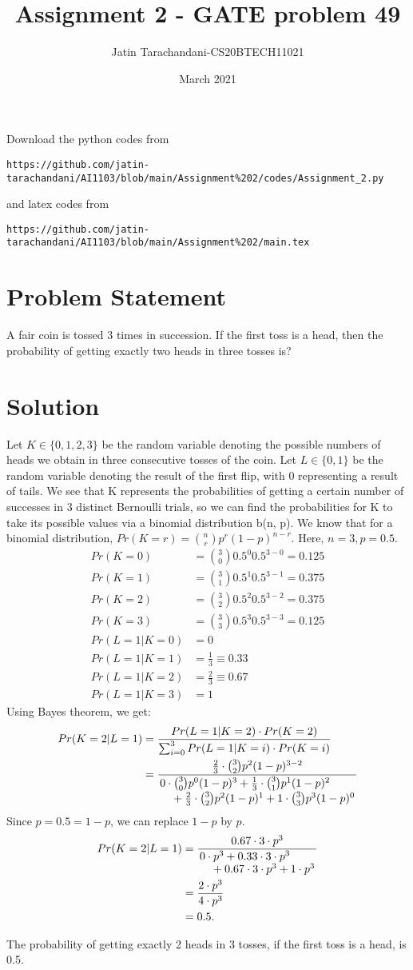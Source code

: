 \documentclass[twocolumn]{article}
\title{Assignment 2 - GATE problem 49}
\author{Jatin Tarachandani-CS20BTECH11021}
\date{March 2021}
\begin{document}
\maketitle
Download the python codes from 
\begin{lstlisting}
https://github.com/jatin-tarachandani/AI1103/blob/main/Assignment%202/codes/Assignment_2.py
\end{lstlisting}
%
and latex codes from 
%
\begin{lstlisting}
https://github.com/jatin-tarachandani/AI1103/blob/main/Assignment%202/main.tex
\end{lstlisting}
\section{Problem Statement}
A fair coin is tossed 3 times in succession. If the first toss is a head, then the probability of getting exactly two heads in three tosses is?
\section{Solution}
Let $K \in \{0, 1, 2, 3\}$ be the random variable denoting the possible numbers of heads we obtain in three consecutive tosses of the coin. Let $L \in \{0, 1\}$ be the random variable denoting the result of the first flip, with 0 representing a result of tails.
We see that K represents the probabilities of getting a certain number of successes in 3 distinct Bernoulli trials, so we can find the probabilities for K to take its possible values via a binomial distribution b(n, p).
We know that for a binomial distribution, $Pr(K=r)=\binom{n}{r}p^r (1-p)^{n-r}$. Here, $n=3, p=0.5$.
\begin{align}
    Pr(K=0)&=\binom{3}{0}0.5^0 0.5^{3-0}=0.125\\
    Pr(K=1)&=\binom{3}{1}0.5^1 0.5^{3-1}=0.375\\
    Pr(K=2)&=\binom{3}{2}0.5^2 0.5^{3-2}=0.375\\
    Pr(K=3)&=\binom{3}{3}0.5^3 0.5^{3-3}=0.125\\
    Pr(L=1|K=0)&=0\\
    Pr(L=1|K=1)&=\frac{1}{3} \equiv 0.33\\
    Pr(L=1|K=2)&=\frac{2}{3} \equiv 0.67\\
    Pr(L=1|K=3)&=1
\end{align}
Using Bayes theorem, we get:
\begin{align*}
    Pr(K=2|L=1)&=\frac{Pr(L=1|K=2)\cdot Pr(K=2)}{\sum_{i=0}^{3} Pr(L=1|K=i)\cdot Pr(K=i)}\\
    &=\frac{\frac{2}{3}\cdot \binom{3}{2}p^2 (1-p)^{3-2}}{\splitfrac{0\cdot\binom{3}{0}p^0 (1-p)^{3}+\frac{1}{3}\cdot\binom{3}{1}p^1 (1-p)^{2}}{+\frac{2}{3}\cdot \binom{3}{2}p^2 (1-p)^{1}+1\cdot \binom{3}{3}p^3 (1-p)^{0}}}
\end{align*}
Since $p=0.5=1-p$, we can replace $1-p$ by $p$.
\begin{align*}
     Pr(K=2|L=1)&=\frac{0.67\cdot 3\cdot  p^3}{\splitfrac{0\cdot p^3+0.33\cdot3\cdot p^3}{+0.67\cdot 3 \cdot p^3+1\cdot p^3}}\\
     &=\frac{2 \cdot p^3}{4 \cdot p^3}\\
    &=0.5.
\end{align*}

The probability of getting exactly 2 heads in 3 tosses, if the first toss is a head, is 0.5.
\end{document}
